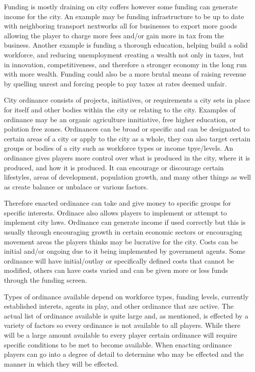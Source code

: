 Funding is mostly draining on city coffers however some funding can generate income for the city. An example may be funding infrastructure to be up to date with neighboring transport nextworks all for businesses to export more goods allowing the player to charge more fees and/or gain more in tax from the business. Another example is funding a thorough education, helping build a solid workforce, and reducing unemployment creating a wealth not only in taxes, but in innovation, competitiveness, and therefore a stronger economy in the long run with more wealth. Funding could also be a more brutal means of raising revenue by quelling unrest and forcing people to pay taxes at rates deemed unfair.




City ordinance consists of projects, initiatives, or requirements a city sets in place for itself and other bodies within the city or relating to the city. Examples of ordinance may be an organic agriculture innitiative, free higher education, or polution free zones. Ordinances can be broad or specific and can be designated to certain areas of a city or apply to the city as a whole, they can also target certain groups or bodies of a city such as workforce types or income tpye/levels. An ordinance gives players more control over what is produced in the city, where it is produced, and how it is produced. It can encourage or discourage certain lifestyles, areas of development, population growth, and many other things as well as create balance or unbalace or various factors.

Therefore enacted ordinance can take and give money to specific groups for specific interests. Ordinace also allows players to implement or attempt to implement city laws. Ordinance can generate income if used correctly but this is usually through encouraging growth in certain economic sectors or encouraging movement areas the players thinks may be lucrative for the city. Costs can be initial and/or ongoing due to it being implemented by government agents. Some ordinance will have initial/outlay or specifically defined costs that cannot be modified, others can have costs varied and can be given more or less funds through the funding screen. 


Types of ordinance available depend on workforce types, funding levels, currently established interets, agents in play, and other ordinance that are active. The actual list of ordinance available is quite large and, as mentioned, is effected by a variety of factors so every ordinance is not available to all players. While there will be a large amount available to every player certain ordinance will require specific conditions to be met to become available. When enacting ordinance players can go into a degree of detail to determine who may be effected and the manner in which they will be effected. 




